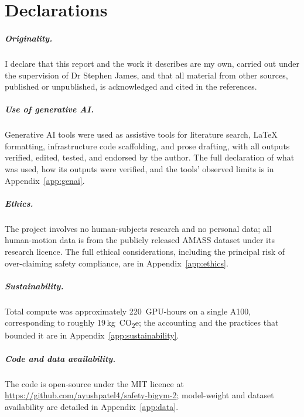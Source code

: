 \documentclass[11pt,a4paper]{report}
\begin{document}
\clearpage
\chapter*{Declarations}

\paragraph{Originality.}
I declare that this report and the work it describes are my own,
carried out under the supervision of Dr Stephen James, and that all
material from other sources, published or unpublished, is
acknowledged and cited in the references.

\paragraph{Use of generative AI.}
Generative AI tools were used as assistive tools for literature
search, \LaTeX{} formatting, infrastructure code scaffolding, and
prose drafting, with all outputs verified, edited, tested, and
endorsed by the author. The full declaration of what was used, how
its outputs were verified, and the tools' observed limits is in
Appendix~\ref{app:genai}.

\paragraph{Ethics.}
The project involves no human-subjects research and no personal
data; all human-motion data is from the publicly released AMASS
dataset under its research licence. The full ethical considerations,
including the principal risk of over-claiming safety compliance, are
in Appendix~\ref{app:ethics}.

\paragraph{Sustainability.}
Total compute was approximately 220~GPU-hours on a single A100,
corresponding to roughly 19\,kg~CO\textsubscript{2}e; the accounting
and the practices that bounded it are in
Appendix~\ref{app:sustainability}.

\paragraph{Code and data availability.}
The code is open-source under the MIT licence at
\url{https://github.com/ayushpatel4/safety-bigym-2}; model-weight and
dataset availability are detailed in Appendix~\ref{app:data}.
\end{document}
